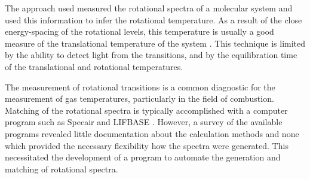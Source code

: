 The approach used measured the rotational spectra of
a molecular system and used this information to infer the rotational
temperature. As a result of the close energy-spacing of the rotational levels,
this temperature is usually a good measure of the translational temperature of
the system \cite{Laux1993}. This technique is limited by the ability to detect
light from the transitions, and by the equilibration time of the translational
and rotational temperatures.

The measurement of rotational transitions is a common diagnostic for the
measurement of gas temperatures, particularly in the field of combustion.
Matching of the rotational spectra is typically accomplished with a computer
program such as Specair \cite{Laux2002} and LIFBASE \cite{Luque1999}. However, a
survey of the available programs revealed little documentation about the
calculation methods and none which provided the necessary flexibility how the
spectra were generated. This necessitated the development of a program to
automate the generation and matching of rotational spectra.
